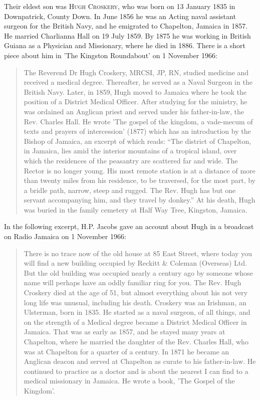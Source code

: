 Their eldest son was \textsc{Hugh Croskery},  who was born on 13 January 1835 in Downpatrick, County Down. In June 1856 he was an Acting naval assistant surgeon for the British Navy, and he emigrated to Chapelton, Jamaica in 1857.  He married Charlianna Hall on 19 July 1859. By 1875 he was working in British Guiana as a Physician and Missionary, where he died in 1886. There is a short piece about him in 'The Kingston Roundabout' on 1 November 1966:
\begin{quotation}
The Reverend Dr Hugh Croskery, MRCSI, JP, RN, studied medicine and received a medical degree. Thereafter, he served as a Naval Surgeon in the British Navy. Later, in 1859, Hugh moved to Jamaica where he took the position of a District Medical Officer. After studying for the ministry, he was ordained an Anglican priest and served under his father-in-law, the Rev. Charles Hall. He wrote 'The gospel of the kingdom, a vade-mecum of texts and prayers of intercession' (1877) which has an introduction by the Bishop of Jamaica, an excerpt of which reads: ``The district of Chapelton, in Jamaica, lies amid the interior mountains of a tropical island, over which the residences of the peasantry are scattered far and wide. The Rector is no longer young. His most remote station is at a distance of more than twenty miles from his residence, to be traversed, for the most part, by a bridle path, narrow, steep and rugged. The Rev. Hugh has but one servant accompanying him, and they travel by donkey.'' At his death, Hugh was buried in the family cemetery at Half Way Tree, Kingston, Jamaica.
\end{quotation}
In the following excerpt, H.P. Jacobs gave an account about Hugh in a broadcast on Radio Jamaica on 1 November 1966:
\begin{quotation}
There is no trace now of the old house at 85 East Street, where today you will find a new building occupied by Reckitt \& Coleman (Overseas) Ltd.  But the old building was occupied nearly a century ago by someone whose name will perhaps  
have an oddly familiar ring for you. The Rev. Hugh Croskery died at the age of 51, but almost everything about his not very long life was unusual, including his death. Croskery was an Irishman, an Ulsterman, born in 1835.  He started as a naval surgeon, of all things, and on the strength of a Medical degree became a District Medical Officer in Jamaica. That was as early as 1857, and he stayed many years at Chapelton, where he married the daughter of the Rev. Charles Hall, who was at Chapelton for a quarter of a century. In 1871 he became an Anglican deacon and served at Chapelton as curate to his father-in-law.  He continued to practice as a doctor and is about the nearest I can find to a medical missionary in Jamaica. He wrote a book, 'The Gospel of the Kingdom'.
 \end{quotation}
    
